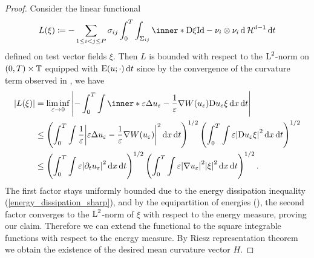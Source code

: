 \begin{proof}
	Consider the linear functional 
	\begin{equation*}
		L ( \xi )
		\coloneqq
		- \sum_{ 1 \leq i < j \leq P }
			\sigma_{ i j }
			\int_{ 0 }^{ T }
				\int_{ \Sigma_{ i j } }
					\inner*{ \diff \xi }{ \mathrm{Id} - \nu_{ i } \otimes \nu_{ 
					i } }
				\dd{ \hm^{ d - 1 } }
			\dd{ t }
	\end{equation*}
	defined on test vector fields $ \xi $. Then $ L $ is bounded with respect 
	to the $ \operatorname{L}^{ 2 } $-norm on $ ( 0 , T ) \times \operatorname{\mathbb{T}} $ equipped with 
	$ \operatorname{E} ( u ; \cdot ) \dd{ t } $ since by the convergence of the 
	curvature 
	term observed in , we have
	\begin{align*}
		\abs{ L ( \xi ) }
		& =
		\liminf_{ \varepsilon \to 0 }
			\abs{ 
				-
				\int_{ 0 }^{ T }
					\int
						\inner*{
							\varepsilon \Delta u_{ \varepsilon } 
							-
							\frac{ 1 }{ \varepsilon }
							\nabla W ( u_{ \varepsilon } )
						}
						{ \diff u_{ \varepsilon } \xi }
					\dd{ x }
				\dd{ t }
			}
		\\
		& \leq
		\left(
			\int_{ 0 }^{ T }
				\int
					\frac{ 1 }{ \varepsilon }
					\abs{ 
						\varepsilon \Delta u_{ \varepsilon }
						-
						\frac{ 1 }{ \varepsilon }
						\nabla W ( u_{ \varepsilon } )
					}^{ 2 }
				\dd{ x }
			\dd{ t }
		\right)^{ 1/2 }
		\left(
			\int_{ 0 }^{ T }
				\int
					\varepsilon
					\abs{ \diff u_{ \varepsilon } \xi }^{ 2 }
				\dd{ x }
			\dd{ t }
		\right)^{ 1/2 }
		\\
		& \leq
				\left(
		\int_{ 0 }^{ T }
		\int
		 \varepsilon
		\abs{ 
		\partial_{ t } u_{ \varepsilon }
		}^{ 2 }
		\dd{ x }
		\dd{ t }
		\right)^{ 1/2 }
		\left(
		\int_{ 0 }^{ T }
		\int
		\varepsilon
		\abs{ \nabla u_{ \varepsilon } }^{ 2 }
		\abs{ \xi }^{ 2 }
		\dd{ x }
		\dd{ t }
		\right)^{ 1/2 }.
	\end{align*}
	The first factor stays uniformly bounded due to the energy dissipation 
	inequality (\ref{energy_dissipation_sharp}), and by the equipartition of 
	energies (), the second factor 
	converges to the $ \operatorname{L}^{ 2 } $-norm of $ \xi $ with respect to the energy 
	measure, proving our claim. Therefore we can extend the functional to 
	the square integrable functions with respect to the energy measure. By 
	Riesz representation theorem we obtain the existence of the desired mean 
	curvature vector $ H $.
	

\end{proof}
